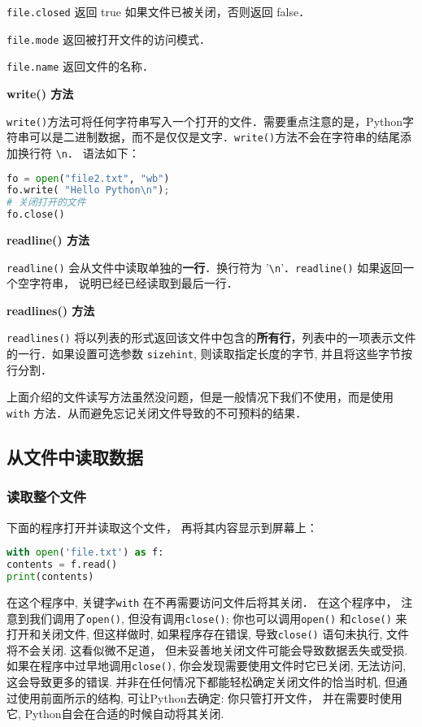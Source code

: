 \verb|file.closed| 返回 true 如果文件已被关闭，否则返回 false．

\verb|file.mode| 返回被打开文件的访问模式．

\verb|file.name| 返回文件的名称．


\textbf{write() 方法}

\verb|write()|方法可将任何字符串写入一个打开的文件．需要重点注意的是，Python字符串可以是二进制数据，而不是仅仅是文字．\verb|write()|方法不会在字符串的结尾添加换行符 \verb|\n|． 语法如下：
\begin{lstlisting}[language=python]
fo = open("file2.txt", "wb")
fo.write( "Hello Python\n");
# 关闭打开的文件
fo.close()
\end{lstlisting}

\textbf{readline() 方法}

\verb|readline()| 会从文件中读取单独的\textbf{一行}．换行符为 '\verb|\n|'．\verb|readline()| 如果返回一个空字符串， 说明已经已经读取到最后一行．

\textbf{readlines() 方法}

\verb|readlines()| 将以列表的形式返回该文件中包含的\textbf{所有行}，列表中的一项表示文件的一行．如果设置可选参数 \verb|sizehint|, 则读取指定长度的字节, 并且将这些字节按行分割．

上面介绍的文件读写方法虽然没问题，但是一般情况下我们不使用，而是使用\verb|with| 方法．从而避免忘记关闭文件导致的不可预料的结果．


\subsection{从文件中读取数据}
\subsubsection{读取整个文件}
下面的程序打开并读取这个文件， 再将其内容显示到屏幕上：
\begin{lstlisting}[language=python]
with open('file.txt') as f:
contents = f.read()
print(contents)
\end{lstlisting}
在这个程序中, 关键字\verb|with| 在不再需要访问文件后将其关闭． 在这个程序中， 注意到我们调用了\verb|open()|, 但没有调用\verb|close()|; 你也可以调用\verb|open()| 和\verb|close()| 来打开和关闭文件, 但这样做时, 如果程序存在错误, 导致\verb|close()| 语句未执行, 文件将不会关闭.  这看似微不足道， 但未妥善地关闭文件可能会导致数据丢失或受损.  如果在程序中过早地调用\verb|close()|, 你会发现需要使用文件时它已关闭, 无法访问, 这会导致更多的错误. 并非在任何情况下都能轻松确定关闭文件的恰当时机, 但通过使用前面所示的结构, 可让Python去确定: 你只管打开文件， 并在需要时使用它, Python自会在合适的时候自动将其关闭.

